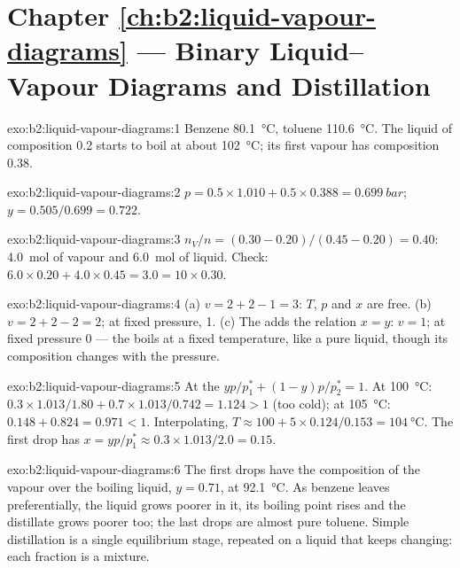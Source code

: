 \section*{Chapter \ref{ch:b2:liquid-vapour-diagrams} --- Binary Liquid--Vapour Diagrams and Distillation}

\begin{solution}{exo:b2:liquid-vapour-diagrams:1}
Benzene \qty{80.1}{\degreeCelsius}, toluene \qty{110.6}{\degreeCelsius}. The liquid
of composition 0.2 starts to boil at about \qty{102}{\degreeCelsius}; its first
vapour has composition 0.38.
\end{solution}

\begin{solution}{exo:b2:liquid-vapour-diagrams:2}
$p = 0.5 \times 1.010 + 0.5 \times 0.388 = \qty{0.699}{bar}$;
$y = 0.505/0.699 = 0.722$.
\end{solution}

\begin{solution}{exo:b2:liquid-vapour-diagrams:3}
$n_V/n = (0.30 - 0.20)/(0.45 - 0.20) = 0.40$: \qty{4.0}{mol} of vapour and
\qty{6.0}{mol} of liquid. Check: $6.0 \times 0.20 + 4.0 \times 0.45 = 3.0 = 10
\times 0.30$.
\end{solution}

\begin{solution}{exo:b2:liquid-vapour-diagrams:4}
(a) $v = 2 + 2 - 1 = 3$: $T$, $p$ and $x$ are free. (b) $v = 2 + 2 - 2 = 2$; at
fixed pressure, 1. (c) The  adds the relation $x = y$: $v = 1$; at fixed
pressure 0 --- the  boils at a fixed temperature, like a pure liquid,
though its composition changes with the pressure.
\end{solution}

\begin{solution}{exo:b2:liquid-vapour-diagrams:5}
At the  $yp/p_1^* + (1 - y)p/p_2^* = 1$. At \qty{100}{\degreeCelsius}:
$0.3 \times 1.013/1.80 + 0.7 \times 1.013/0.742 = 1.124 > 1$ (too cold); at
\qty{105}{\degreeCelsius}: $0.148 + 0.824 = 0.971 < 1$. Interpolating, $T \approx
100 + 5 \times 0.124/0.153 = \qty{104}{\degreeCelsius}$. The first drop has $x =
yp/p_1^* \approx 0.3 \times 1.013/2.0 = 0.15$.
\end{solution}

\begin{solution}{exo:b2:liquid-vapour-diagrams:6}
The first drops have the composition of the vapour over the boiling liquid,
$y = 0.71$, at \qty{92.1}{\degreeCelsius}. As benzene leaves preferentially, the
liquid grows poorer in it, its boiling point rises and the distillate grows
poorer too; the last drops are almost pure toluene. Simple distillation is a
single equilibrium stage, repeated on a liquid that keeps changing: each
fraction is a mixture.
\end{solution}

